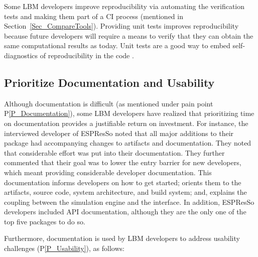 \documentclass[final, 3p, times, authoryear]{elsarticle}
\newcommand{\ppref}[1]{P\ref{#1}}
\begin{document}
Some LBM developers improve reproducibility via automating the verification
tests and making them part of a CI process (mentioned in
Section~\ref{Sec_CompareTools}).  Providing unit tests improves reproducibility
because future developers will require a means to verify that they can obtain
the same computational results as today.  Unit tests are a good way to embed
self-diagnostics of reproducibility in the code \citep{BenureauAndRougier2017}.

\subsection{Prioritize Documentation and Usability} \label{Sec_RecommendDoc}

Although documentation is difficult (as mentioned under pain point
\ppref{P_Documentation}), some LBM developers have realized that prioritizing time
on documentation provides a justifiable return on investment. For instance, the
interviewed developer of ESPResSo noted that all major additions to their
package had accompanying changes to artifacts and documentation. They noted that
considerable effort was put into their documentation. They further commented
that their goal was to lower the entry barrier for new developers, which meant
providing considerable developer documentation. This documentation informs
developers on how to get started; orients them to the artifacts, source code,
system architecture, and build system; and, explains the coupling between
the simulation engine and the interface. In addition, ESPResSo developers
included API documentation, although they are the only one of the top five
packages to do so.

Furthermore, documentation is used by LBM developers to address usability
challenges (\ppref{P_Usability}), as follows:
\end{document}
